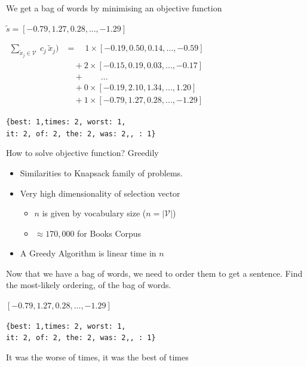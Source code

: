 \documentclass[]{beamer}
\newcommand{\st}{\tilde{s}}
\newcommand{\x}{\tilde{x}}
\newcommand{\V}{\mathcal{V}}
\begin{document}
\begin{frame}{We get a bag of words by minimising an objective function}
	\vectorselectionproblemdefn
	\vfill
	\begin{description}
		\item<2->[Input Vector]  $\st=[−0.79, 1.27, 0.28, ..., −1.29]$
		\vfill
		\item<3->[Vector Selection] $\displaystyle
			\begin{aligned}%
			\sum_{\x_j\in\V}\:c_{j}\,\x_{j})&=\quad1\times[−0.19, 0.50, 0.14, ..., −0.59]\\
			&\quad+2\times[-0.15, 0.19, 0.03, ..., -0.17]\\
			&\quad+\qquad...\\
			&\quad+0\times[−0.19, 2.10, 1.34, ..., 1.20]\\
			&\quad+1\times[−0.79, 1.27, 0.28, ..., −1.29]
		\end{aligned}
		$
		\vfill
		\item<4->[BOW] \texttt{\{best: 1,times: 2, worst: 1, \\it: 2, of: 2, the: 2, was: 2,, : 1\}}
	\end{description}
\end{frame}

\begin{frame}{How to solve objective function? Greedily}
	\vectorselectionproblemdefn
		\vfill
	\begin{itemize}
		\item<1-> Similarities to \alert{Knapsack} family of problems.
		\item<2-> Very high dimensionality of selection vector\begin{itemize}
			\item $n$ is given by vocabulary size ($n=|\V|$)
			\item $\approx170,000$ for Books Corpus
			\end{itemize}
		\item<3-> A Greedy Algorithm is linear time in $n$ 
	\end{itemize}
	\vfill
	\footfullcite{White2015BOWgen}	
\end{frame}






\begin{frame}{Now that we have a bag of words, we need to order them to get a sentence.}
	\vfill
		Find the most-likely ordering, of the bag of words.
	\vfill
	\begin{description}
		\item<1->[Input Vector]  $[−0.79, 1.27, 0.28, ..., −1.29]$
		\item<1->[Bag of Words]  \texttt{\{best: 1,times: 2, worst: 1,\\ it: 2, of: 2, the: 2, was: 2,, : 1\}}
		\vspace{1em}
		\item<1->[Output Sentence] It was the worse of times, it was the best of times
	\end{description}
	\vfill
\end{frame}
\end{document}

